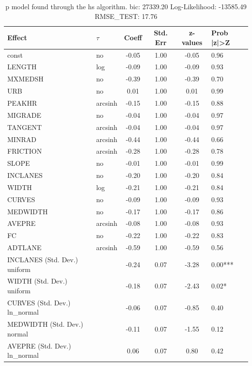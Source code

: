 \begin{table}
	\caption{p model found through the hs algorithm. bic: 27339.20 Log-Likelihood: -13585.49 RMSE_TEST: 17.76}
	\begin{center}
		\begin{tabular}{|l|l|c|c|c|l|}
			\hline
			Effect & $\tau$ & Coeff & Std. Err & z-values & Prob |z|>Z \\
			\hline
			const & no & -0.05 & 1.00 & -0.05 & 0.96 \\
			\hline
			LENGTH & log & -0.09 & 1.00 & -0.09 & 0.93 \\
			\hline
			MXMEDSH & no & -0.39 & 1.00 & -0.39 & 0.70 \\
			\hline
			URB & no & 0.01 & 1.00 & 0.01 & 0.99 \\
			\hline
			PEAKHR & arcsinh & -0.15 & 1.00 & -0.15 & 0.88 \\
			\hline
			MIGRADE & no & -0.04 & 1.00 & -0.04 & 0.97 \\
			\hline
			TANGENT & arcsinh & -0.04 & 1.00 & -0.04 & 0.97 \\
			\hline
			MINRAD & arcsinh & -0.44 & 1.00 & -0.44 & 0.66 \\
			\hline
			FRICTION & arcsinh & -0.28 & 1.00 & -0.28 & 0.78 \\
			\hline
			SLOPE & no & -0.01 & 1.00 & -0.01 & 0.99 \\
			\hline
			INCLANES & no & -0.20 & 1.00 & -0.20 & 0.84 \\
			\hline
			WIDTH & log & -0.21 & 1.00 & -0.21 & 0.84 \\
			\hline
			CURVES & no & -0.09 & 1.00 & -0.09 & 0.93 \\
			\hline
			MEDWIDTH & no & -0.17 & 1.00 & -0.17 & 0.86 \\
			\hline
			AVEPRE & arcsinh & -0.08 & 1.00 & -0.08 & 0.93 \\
			\hline
			FC & no & -0.22 & 1.00 & -0.22 & 0.83 \\
			\hline
			ADTLANE & arcsinh & -0.59 & 1.00 & -0.59 & 0.56 \\
			\hline
			INCLANES (Std. Dev.) uniform &  & -0.24 & 0.07 & -3.28 & 0.00*** \\
			\hline
			WIDTH (Std. Dev.) uniform &  & -0.18 & 0.07 & -2.43 & 0.02* \\
			\hline
			CURVES (Std. Dev.) ln_normal &  & -0.06 & 0.07 & -0.85 & 0.40 \\
			\hline
			MEDWIDTH (Std. Dev.) normal &  & -0.11 & 0.07 & -1.55 & 0.12 \\
			\hline
			AVEPRE (Std. Dev.) ln_normal &  & 0.06 & 0.07 & 0.80 & 0.42 \\

\end{tabular}
\end{center}
\end{table}
